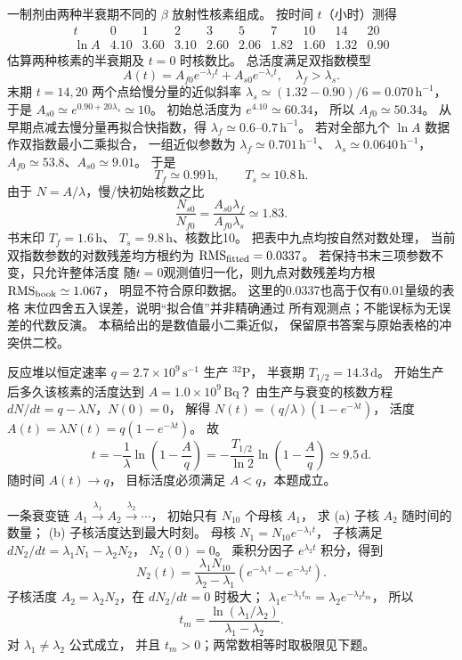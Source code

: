 一制剂由两种半衰期不同的 $\beta$ 放射性核素组成。
按时间 $t$（小时）测得
\[
\begin{array}{c|rrrrrrrrr}
t&0&1&2&3&5&7&10&14&20\\\hline
\ln A&4.10&3.60&3.10&2.60&2.06&1.82&1.60&1.32&0.90
\end{array}
\]
估算两种核素的半衰期及 $t=0$ 时核数比。
\exsolution
总活度满足双指数模型
\[
 A(t)=A_{f0}e^{-\lambda_f t}
 +A_{s0}e^{-\lambda_s t},\quad\lambda_f>\lambda_s.
\]
末期 $t=14,20$ 两个点给慢分量的近似斜率
$\lambda_s\simeq(1.32-0.90)/6=0.070\,\mathrm{h^{-1}}$，
于是 $A_{s0}\simeq e^{0.90+20\lambda_s}\simeq10$。
初始总活度为 $e^{4.10}\simeq60.34$，
所以 $A_{f0}\simeq50.34$。
从早期点减去慢分量再拟合快指数，得
$\lambda_f\simeq0.6$--$0.7\,\mathrm{h^{-1}}$。
若对全部九个 $\ln A$ 数据作双指数最小二乘拟合，
一组近似参数为
$\lambda_f\simeq0.701\,\mathrm{h^{-1}}$、
$\lambda_s\simeq0.0640\,\mathrm{h^{-1}}$，
$A_{f0}\simeq53.8$、$A_{s0}\simeq9.01$。
于是
\[
 \boxed{T_f\simeq0.99\,\mathrm h,\qquad
 T_s\simeq10.8\,\mathrm h}.
\]
由于 $N=A/\lambda$，慢/快初始核数之比
\[
 \boxed{\frac{N_{s0}}{N_{f0}}=
 \frac{A_{s0}\lambda_f}{A_{f0}\lambda_s}
 \simeq1.83}.
\]
\excheck 书末印 $T_f=1.6\,\mathrm h$、
$T_s=9.8\,\mathrm h$、核数比10。
把表中九点均按自然对数处理，
当前双指数参数的对数残差均方根约为
$\mathrm{RMS}_{\rm fitted}=0.0337$。
若保持书末三项参数不变，只允许整体活度
随$t=0$观测值归一化，则九点对数残差均方根
$\mathrm{RMS}_{\rm book}\simeq1.067$，
明显不符合原印数据。
这里的0.0337也高于仅有0.01量级的表格
末位四舍五入误差，说明“拟合值”并非精确通过
所有观测点；不能误标为无误差的代数反演。
本稿给出的是数值最小二乘近似，
保留原书答案与原始表格的冲突供二校。

反应堆以恒定速率
$q=2.7\times10^9\,\mathrm{s^{-1}}$
生产 $\mathrm{^{32}P}$，
半衰期 $T_{1/2}=14.3\,\mathrm d$。
开始生产后多久该核素的活度达到
$A=1.0\times10^9\,\mathrm{Bq}$？
\exsolution
由生产与衰变的核数方程
$dN/dt=q-\lambda N$，$N(0)=0$，
解得
$N(t)=(q/\lambda)(1-e^{-\lambda t})$，
活度
$A(t)=\lambda N(t)=q(1-e^{-\lambda t})$。
故
\[
 \boxed{t=-\frac1\lambda\ln\left(1-\frac Aq\right)
 =-\frac{T_{1/2}}{\ln2}\ln\left(1-\frac Aq\right)
 \simeq9.5\,\mathrm d}.
\]
\excheck 随时间 $A(t)\to q$，
目标活度必须满足 $A<q$，本题成立。

一条衰变链 $A_1\xrightarrow{\lambda_1}A_2
\xrightarrow{\lambda_2}\cdots$，
初始只有 $N_{10}$ 个母核 $A_1$，
求 (a) 子核 $A_2$ 随时间的数量；
(b) 子核活度达到最大时刻。
\exsolution
母核
$N_1=N_{10}e^{-\lambda_1t}$，
子核满足
$dN_2/dt=\lambda_1N_1-\lambda_2N_2$，
$N_2(0)=0$。
乘积分因子 $e^{\lambda_2t}$ 积分，得到
\[
 \boxed{N_2(t)=\frac{\lambda_1N_{10}}
 {\lambda_2-\lambda_1}
 (e^{-\lambda_1t}-e^{-\lambda_2t})}.
\]
子核活度 $A_2=\lambda_2N_2$，在
$dN_2/dt=0$ 时极大；
$\lambda_1e^{-\lambda_1t_m}
 =\lambda_2e^{-\lambda_2t_m}$，
所以
\[
 \boxed{t_m=\frac{\ln(\lambda_1/\lambda_2)}
 {\lambda_1-\lambda_2}}.
\]
\excheck 对 $\lambda_1\ne\lambda_2$ 公式成立，
并且 $t_m>0$；两常数相等时取极限见下题。

